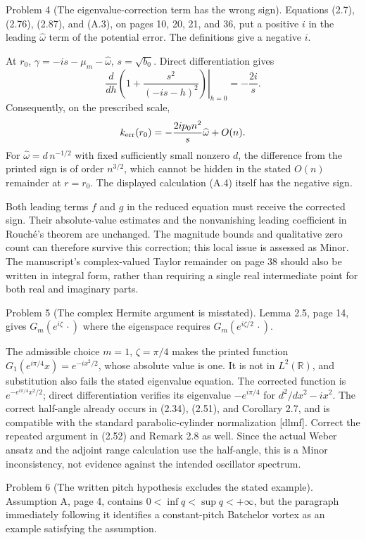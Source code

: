\documentclass[10pt]{article}
\begin{document}
Problem 4 (The eigenvalue-correction term has the wrong sign).  Equations (2.7), (2.76), (2.87), and (A.3), on pages 10, 20, 21, and 36, put a positive \(i\) in the leading \(\widehat\omega\) term of the potential error. The definitions give a negative \(i\).\par
At \(r_0\), \(\gamma=-is-\mu_m-\widehat\omega\), \(s=\sqrt{b_0}\). Direct differentiation gives \[\left.\frac{d}{dh}\left(1+\frac{s^2}{(-is-h)^2}\right)\right|_{h=0}
 =-\frac{2i}{s}.\] Consequently, on the prescribed scale, \[k_{\rm err}(r_0)=-\frac{2ip_0n^2}{s}\widehat\omega+O(n).\] For \(\widehat\omega=d\,n^{-1/2}\) with fixed sufficiently small nonzero \(d\), the difference from the printed sign is of order \(n^{3/2}\), which cannot be hidden in the stated \(O(n)\) remainder at \(r=r_0\). The displayed calculation (A.4) itself has the negative sign.\par
Both leading terms \(f\) and \(g\) in the reduced equation must receive the corrected sign. Their absolute-value estimates and the nonvanishing leading coefficient in Rouché’s theorem are unchanged. The magnitude bounds and qualitative zero count can therefore survive this correction; this local issue is assessed as Minor. The manuscript’s complex-valued Taylor remainder on page 38 should also be written in integral form, rather than requiring a single real intermediate point for both real and imaginary parts.\par
Problem 5 (The complex Hermite argument is misstated).  Lemma 2.5, page 14, gives \(G_m(e^{i\zeta}\,\cdot)\) where the eigenspace requires \(G_m(e^{i\zeta/2}\,\cdot)\).\par
The admissible choice \(m=1\), \(\zeta=\pi/4\) makes the printed function \(G_1(e^{i\pi/4}x)=e^{-ix^2/2}\), whose absolute value is one. It is not in \(L^2(\mathbb R)\), and substitution also fails the stated eigenvalue equation. The corrected function is \(e^{-e^{i\pi/4}x^2/2}\); direct differentiation verifies its eigenvalue \(-e^{i\pi/4}\) for \(d^2/dx^2-ix^2\). The correct half-angle already occurs in (2.34), (2.51), and Corollary 2.7, and is compatible with the standard parabolic-cylinder normalization [dlmf]. Correct the repeated argument in (2.52) and Remark 2.8 as well. Since the actual Weber ansatz and the adjoint range calculation use the half-angle, this is a Minor inconsistency, not evidence against the intended oscillator spectrum.\par
Problem 6 (The written pitch hypothesis excludes the stated example).  Assumption A, page 4, contains \(0<\inf q<\sup q<+\infty\), but the paragraph immediately following it identifies a constant-pitch Batchelor vortex as an example satisfying the assumption.\par
\end{document}
